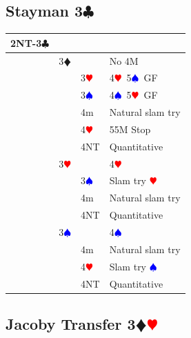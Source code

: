 \documentclass[a4paper]{article}
\newcommand{\BC}{\textcolor{OliveGreen}{$\clubsuit$}}
\newcommand{\BD}{\textcolor{RedOrange}{$\vardiamondsuit$}}
\newcommand{\BH}{\textcolor{Red}{$\varheartsuit${}}}
\newcommand{\BS}{\textcolor{Blue}{$\spadesuit${}}}
\newcommand{\pdfc}{\texorpdfstring{\BC{}}{C}}
\newcommand{\pdfd}{\texorpdfstring{\BD{}}{D}}
\newcommand{\pdfh}{\texorpdfstring{\BH{}}{H}}
\begin{document}
\subsection{Stayman 3\pdfc}

\begingroup
\renewcommand{\arraystretch}{1.4}
\begin{xltabular}{\linewidth}{|l|l|l|X|}
\hline
2NT-3\BC &  &  &  \\
\hline
 & 3\BD &  & No 4M \\
\hline
 &  & 3\BH & 4\BH\ 5\BS\ GF \\
\hline
 &  & 3\BS & 4\BS\ 5\BH\ GF \\
\hline
 &  & 4m & Natural slam try \\
\hline
 &  & 4\BH & 55M Stop \\
\hline
 &  & 4NT & Quantitative \\
\hline
 & 3\BH &  & 4\BH \\
\hline
 &  & 3\BS & Slam try \BH \\
\hline
 &  & 4m & Natural slam try \\
\hline
 &  & 4NT & Quantitative \\
\hline
 & 3\BS &  & 4\BS \\
\hline
 &  & 4m & Natural slam try \\
\hline
 &  & 4\BH & Slam try \BS \\
\hline
 &  & 4NT & Quantitative \\
\hline
\end{xltabular}
\endgroup
\bigbreak
\subsection{Jacoby Transfer 3\pdfd\pdfh}
\end{document}
